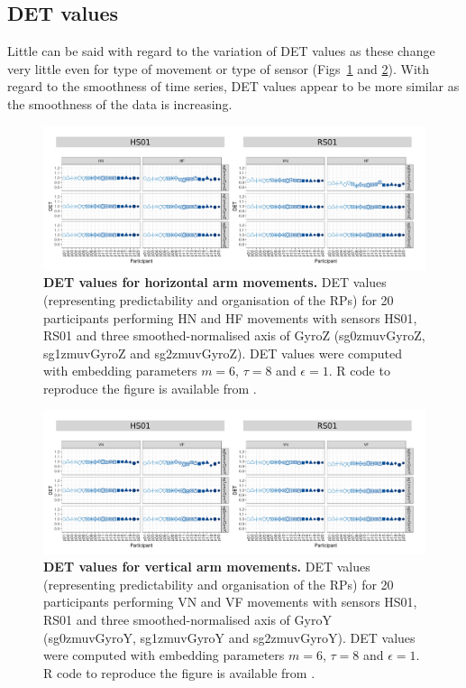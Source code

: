 






\subsection{DET values}
Little can be said with regard to the variation of DET values
as these change very little even for type of movement or type of sensor
(Figs~\ref{fig:det_aH} and \ref{fig:det_aV}).
With regard to the smoothness of time series, DET values appear to be more similar 
as the smoothness of the data is increasing.
\begin{figure}[!h]
\centering
\includegraphics[width=1.0\textwidth]{det_aH}
    \caption{
	{\bf DET values for horizontal arm movements.}	
    	DET values (representing predictability and organisation of the RPs) for 
	20 participants performing HN and HF movements
	with sensors HS01, RS01 and three smoothed-normalised axis 
	of GyroZ (sg0zmuvGyroZ, sg1zmuvGyroZ and sg2zmuvGyroZ).
	DET values were computed with 
	embedding parameters $m=6$, $\tau=8$ and $\epsilon=1$.
	R code to reproduce the figure is available from \cite{hwum2018}.
        }
    \label{fig:det_aH}
\end{figure}
\begin{figure}[!h]
\centering
\includegraphics[width=1.0\textwidth]{det_aV}
    \caption{
	{\bf DET values for vertical arm movements.}	
    	DET values (representing predictability and organisation of the RPs) for 
	20 participants performing VN and VF movements
	with sensors HS01, RS01 and three smoothed-normalised axis 
	of GyroY (sg0zmuvGyroY, sg1zmuvGyroY and sg2zmuvGyroY).
	DET values were computed with 
	embedding parameters $m=6$, $\tau=8$ and $\epsilon=1$.
	R code to reproduce the figure is available from \cite{hwum2018}.
        }
    \label{fig:det_aV}
\end{figure}
